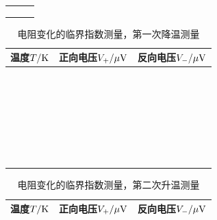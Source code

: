 \documentclass[11pt,a4paper]{ctexart}
\begin{document}
\begin{enumerate}
\begin{table}[H]
\begin{tabular}{|p{32mm}|p{32mm}|p{32mm}|}
  &  &\\ \hline
    & &\\ \hline
  & &\\ \hline
   & &\\ \hline
  \end{tabular}
  \end{table}
\begin{table}[H]
\centering
\caption{电阻变化的临界指数测量\label{tableex2}，第一次降温测量}
\begin{tabular}{|p{32mm}|p{32mm}|p{32mm}|}
\hline
温度$T/{\rm K}$ & 正向电压$V_+/{\rm \mu V}$ & 反向电压$V_-/{\rm \mu V}$ \\ \hline
 & & \\ \hline
  & & \\ \hline
  & & \\ \hline
   & & \\ \hline
    & & \\ \hline
 & & \\ \hline
  &  &\\ \hline
  &  &\\ \hline
  &  &\\ \hline
  &  &\\ \hline
  &  &\\ \hline
  &  &\\ \hline
  &  &\\ \hline
  &  &\\ \hline
  &  &\\ \hline
  &  &\\ \hline
  &  &\\ \hline
  &  &\\ \hline
    & &\\ \hline
  & &\\ \hline
   & &\\ \hline
     &  &\\ \hline
  &  &\\ \hline
  &  &\\ \hline
  &  &\\ \hline
    & &\\ \hline
  & &\\ \hline
   & &\\ \hline
  \end{tabular}
  \end{table}
\begin{table}[H]
\centering
\caption{电阻变化的临界指数测量\label{tableex3}，第二次升温测量}
\begin{tabular}{|p{32mm}|p{32mm}|p{32mm}|}
\hline
温度$T/{\rm K}$ & 正向电压$V_+/{\rm \mu V}$ & 反向电压$V_-/{\rm \mu V}$ \\ \hline

\end{tabular}
\end{table}
\end{enumerate}
\end{document}
